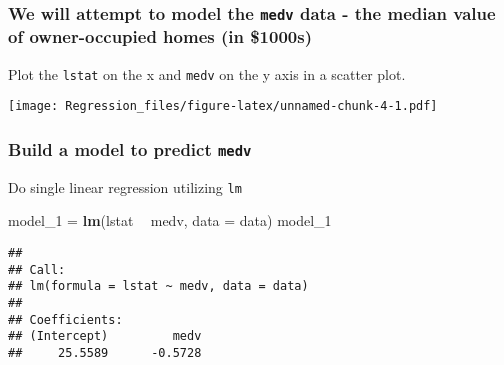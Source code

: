\documentclass[]{article}
\newenvironment{Shaded}{\begin{snugshade}}{\end{snugshade}}
\newcommand{\DataTypeTok}[1]{\textcolor[rgb]{0.13,0.29,0.53}{#1}}
\newcommand{\DecValTok}[1]{\textcolor[rgb]{0.00,0.00,0.81}{#1}}
\newcommand{\KeywordTok}[1]{\textcolor[rgb]{0.13,0.29,0.53}{\textbf{#1}}}
\newcommand{\NormalTok}[1]{#1}
\newcommand{\OperatorTok}[1]{\textcolor[rgb]{0.81,0.36,0.00}{\textbf{#1}}}
\newcommand{\StringTok}[1]{\textcolor[rgb]{0.31,0.60,0.02}{#1}}
\begin{document}
\hypertarget{we-will-attempt-to-model-the-medv-data---the-median-value-of-owner-occupied-homes-in-1000s}{%
\subsubsection{\texorpdfstring{We will attempt to model the
\texttt{medv} data - the median value of owner-occupied homes (in
\$1000s)}{We will attempt to model the medv data - the median value of owner-occupied homes (in \$1000s)}}\label{we-will-attempt-to-model-the-medv-data---the-median-value-of-owner-occupied-homes-in-1000s}}

Plot the \texttt{lstat} on the x and \texttt{medv} on the y axis in a
scatter plot.

\begin{Shaded}
\end{Shaded}

\texttt{[image: Regression\_files/figure-latex/unnamed-chunk-4-1.pdf]}

\hypertarget{build-a-model-to-predict-medv}{%
\subsubsection{\texorpdfstring{Build a model to predict
\texttt{medv}}{Build a model to predict medv}}\label{build-a-model-to-predict-medv}}

Do single linear regression utilizing \texttt{lm}

\begin{Shaded}
\begin{Highlighting}[]
\NormalTok{model_}\DecValTok{1}\NormalTok{ =}\StringTok{ }\KeywordTok{lm}\NormalTok{(lstat }\OperatorTok{~}\StringTok{ }\NormalTok{medv, }\DataTypeTok{data =}\NormalTok{ data)}
\NormalTok{model_}\DecValTok{1}
\end{Highlighting}
\end{Shaded}

\begin{verbatim}
## 
## Call:
## lm(formula = lstat ~ medv, data = data)
## 
## Coefficients:
## (Intercept)         medv  
##     25.5589      -0.5728
\end{verbatim}
\end{document}
